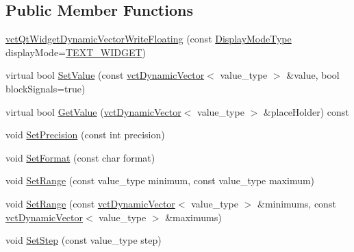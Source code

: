 \subsection*{Public Member Functions}
\begin{DoxyCompactItemize}
\item 
\hyperlink{classvct_qt_widget_dynamic_vector_write_floating_a7a52edc2beb9d6d2c611fe95e2d527c1}{vct\-Qt\-Widget\-Dynamic\-Vector\-Write\-Floating} (const \hyperlink{classvct_qt_widget_dynamic_vector_write_base_aefbf6a51f1009f060305c2b5e106cf02}{Display\-Mode\-Type} display\-Mode=\hyperlink{classvct_qt_widget_dynamic_vector_write_base_aefbf6a51f1009f060305c2b5e106cf02aa84e1bae39afe989e862b07258d0889e}{T\-E\-X\-T\-\_\-\-W\-I\-D\-G\-E\-T})
\item 
virtual bool \hyperlink{classvct_qt_widget_dynamic_vector_write_floating_a76a5c456bddfe42347c14758d1d4b97d}{Set\-Value} (const \hyperlink{classvct_dynamic_vector}{vct\-Dynamic\-Vector}$<$ value\-\_\-type $>$ \&value, bool block\-Signals=true)
\item 
virtual bool \hyperlink{classvct_qt_widget_dynamic_vector_write_floating_a20fd872d576e23301dab4160d76c6cb3}{Get\-Value} (\hyperlink{classvct_dynamic_vector}{vct\-Dynamic\-Vector}$<$ value\-\_\-type $>$ \&place\-Holder) const 
\item 
void \hyperlink{classvct_qt_widget_dynamic_vector_write_floating_adc5d05c37e5661b4b1135f8f1f789864}{Set\-Precision} (const int precision)
\item 
void \hyperlink{classvct_qt_widget_dynamic_vector_write_floating_a207f70b5aa4c9b12f61b563fcf79bfb8}{Set\-Format} (const char format)
\item 
void \hyperlink{classvct_qt_widget_dynamic_vector_write_floating_a5200838704a33065494e0931b0760098}{Set\-Range} (const value\-\_\-type minimum, const value\-\_\-type maximum)
\item 
void \hyperlink{classvct_qt_widget_dynamic_vector_write_floating_a506fb335090b5e6c14e591a683c2e5d4}{Set\-Range} (const \hyperlink{classvct_dynamic_vector}{vct\-Dynamic\-Vector}$<$ value\-\_\-type $>$ \&minimums, const \hyperlink{classvct_dynamic_vector}{vct\-Dynamic\-Vector}$<$ value\-\_\-type $>$ \&maximums)
\item 
void \hyperlink{classvct_qt_widget_dynamic_vector_write_floating_aab56caf76f149337025a81e5e30650ee}{Set\-Step} (const value\-\_\-type step)
\end{DoxyCompactItemize}
